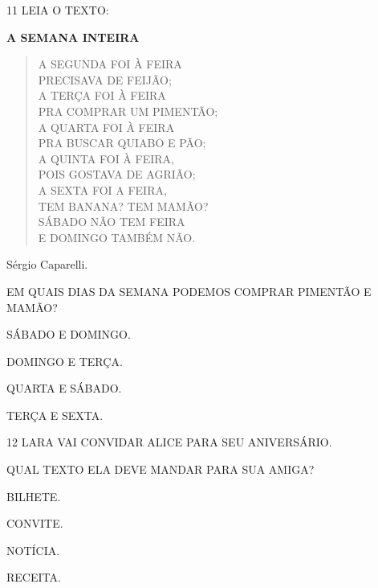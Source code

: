 

\num{11} LEIA O TEXTO:

\textbf{A SEMANA INTEIRA}

\begin{verse}
A SEGUNDA FOI À FEIRA\\
PRECISAVA DE FEIJÃO;\\
A TERÇA FOI À FEIRA\\
PRA COMPRAR UM PIMENTÃO;\\
A QUARTA FOI À FEIRA\\
PRA BUSCAR QUIABO E PÃO;\\
A QUINTA FOI À FEIRA,\\
POIS GOSTAVA DE AGRIÃO;\\
A SEXTA FOI A FEIRA,\\
TEM BANANA? TEM MAMÃO?\\
SÁBADO NÃO TEM FEIRA\\
E DOMINGO TAMBÉM NÃO.
\end{verse}

Sérgio Caparelli.


EM QUAIS DIAS DA SEMANA PODEMOS COMPRAR PIMENTÃO E MAMÃO?

\begin{escolha}
\item SÁBADO E DOMINGO.

\item DOMINGO E TERÇA.

\item QUARTA E SÁBADO.

\item TERÇA E SEXTA.
\end{escolha}


\num{12} LARA VAI CONVIDAR ALICE PARA SEU ANIVERSÁRIO.

QUAL TEXTO ELA DEVE MANDAR PARA SUA AMIGA? 

\begin{escolha}
\item BILHETE.

\item CONVITE.

\item NOTÍCIA.

\item RECEITA.
\end{escolha}

